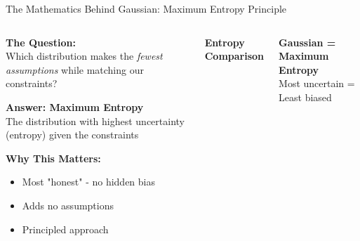 \documentclass[aspectratio=169]{beamer}
\begin{document}
\begin{frame}{The Mathematics Behind Gaussian: Maximum Entropy Principle}
\begin{columns}
\begin{tcolorbox}[colback=yellow!5, colframe=orange!40, title={\textbf{The Core Principle}}]
\textbf{The Question:}\\
Which distribution makes the \textit{fewest assumptions} while matching our constraints?

\vspace{4mm}
\textbf{Answer: Maximum Entropy}\\
The distribution with highest uncertainty (entropy) given the constraints

\vspace{4mm}
\textbf{Why This Matters:}
\begin{itemize}
\item Most "honest" - no hidden bias
\item Adds no assumptions
\item Principled approach
\end{itemize}
\end{tcolorbox}

\begin{center}
\textbf{Entropy Comparison}\\[3mm]
\end{center}

\vspace{3mm}
\begin{tcolorbox}[colback=blue!5, colframe=blue!40]
\centering\small
\textbf{Gaussian = Maximum Entropy}\\
Most uncertain = Least biased
\end{tcolorbox}
\end{columns}
\end{frame}
\end{document}
